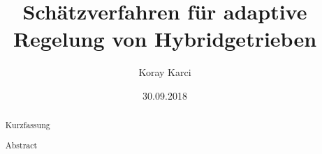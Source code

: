 \documentclass[thesis=da, language=german, paper=a4]{isys}[2013/06/28]
\title{Schätzverfahren für adaptive Regelung von Hybridgetrieben}
\author{Koray Karci}
\date{30.09.2018}		%
\begin{document}
\maketitle




	
\begin{abstract}
Kurzfassung
\end{abstract}

\newpage
\begin{otherlanguage}{english}
\begin{abstract}
Abstract 
\end{abstract}
\end{otherlanguage}


	
	
\setcounter{tocdepth}{1} %
\cleardoublepage
{}
\tableofcontents



\end{document}
